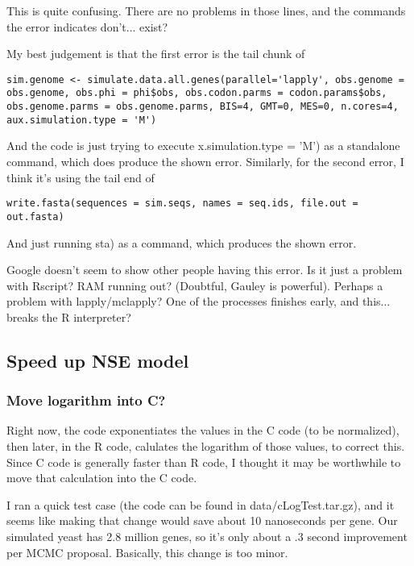 This is quite confusing. There are no problems in those lines, and the commands the error indicates don't... exist?

My best judgement is that the first error is the tail chunk of
\begin{verbatim}
sim.genome <- simulate.data.all.genes(parallel='lapply', obs.genome = obs.genome, obs.phi = phi$obs, obs.codon.parms = codon.params$obs, obs.genome.parms = obs.genome.parms, BIS=4, GMT=0, MES=0, n.cores=4, aux.simulation.type = 'M')
\end{verbatim}

And the code is just trying to execute x.simulation.type = 'M') as a standalone command, which does produce the shown error. Similarly, for the second error, I think it's using the tail end of

\begin{verbatim}
write.fasta(sequences = sim.seqs, names = seq.ids, file.out = out.fasta)
\end{verbatim}

And just running sta) as a command, which produces the shown error.

Google doesn't seem to show other people having this error. Is it just a problem with Rscript? RAM running out? (Doubtful, Gauley is powerful). Perhaps a problem with lapply/mclapply? One of the processes finishes early, and this... breaks the R interpreter?


\subsection{Speed up NSE model}

\subsubsection{Move logarithm into C?}

Right now, the code exponentiates the values in the C code (to be normalized), then later, in the R code, calulates the logarithm of those values, to correct this. Since C code is generally faster than R code, I thought it may be worthwhile to move that calculation into the C code.

I ran a quick test case (the code can be found in data/cLogTest.tar.gz), and it seems like making that change would save about 10 nanoseconds per gene. Our simulated yeast has 2.8 million genes, so it's only about a .3 second improvement per MCMC proposal. Basically, this change is too minor.

